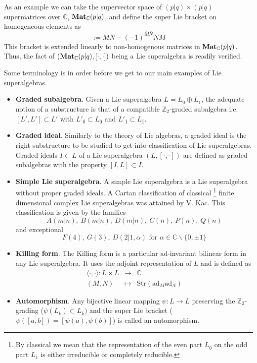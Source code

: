 \documentclass[a4paper,12pt]{article}
\numberwithin{equation}{section}
\numberwithin{thm}{section}
\numberwithin{exm}{section}
\newcommand{\ad}{\mathrm{ad}}
\newcommand{\str}{\mathrm{Str}}
\newcommand{\Z}{{\mathbb Z}}
\newcommand{\C}{{\mathbb C}}
\newcommand{\<}{{\langle}}
\renewcommand{\>}{{\rangle}}
\newcommand{\ev}{{\bar 0}}
\newcommand{\od}{{\bar 1}}
\renewcommand{\a}{{\alpha}}
\begin{document}
As an example we can take the supervector space of $(p|q)\times(p|q)$ supermatrices over $\C$, ${\bf Mat}_{\C}(p|q)$, and define the super Lie bracket on homogeneous elements as
	\begin{equation}
	[M,N] := MN - (-1)^{\bar M\bar N}NM
	\end{equation}
This bracket is extended linearly to non-homogenous matrices in ${\bf Mat}_\C(p|q)$. Thus, the fact of $({\bf Mat}_\C(p|q), [\cdot,\cdot])$ being a Lie superalgebra is readily verified.

Some terminology is in order before we get to our main examples of Lie superalgebras.
	\begin{itemize}
	\item {\bf Graded subalgebra}. Given a Lie superalgebra $L = L_\ev\oplus L_\od$, the adequate notion of a substructure is that of a compatible $\Z_2$-graded subalgebra i.e. $[L',L']\subset L'$ with $L'_\ev \subset L_\ev$ and $L'_\od\subset L_\od$.
	\item {\bf Graded ideal}. Similarly to the theory of Lie algebras, a graded ideal is the right substructure to be studied to get into classification of Lie superalgebras. Graded ideals $I\subset L$ of a Lie superalgebra $(L,[\cdot,\cdot])$ are defined as graded subalgebras with the property $[I,L] \subset I$.
	\item {\bf Simple Lie superalgebra}. A simple Lie superalgebra is a Lie superalgebra without proper graded ideals. A Cartan classification of classical%
\footnote{By classical we mean that the representation of the even part $L_\ev$ on the odd part $L_\od$ is either irreducible or completely reducible.}
finite dimensional complex Lie superalgebras was attained by V. Kac\cite{Kac1977a}. This classification is given by the families
	\begin{equation}
	A(m|n),\ B(m|n),\ D(m|n),\ C(n),\ P(n),\ Q(n)
	\end{equation}
	and exceptional
	\begin{equation}
	F(4),\ G(3),\ D(2|1,\a)\text{ for }\a\in\C\backslash\{0,\pm 1\}
	\end{equation}
	\item {\bf Killing form}. The Killing form is a particular $\ad$-invariant bilinear form in any Lie superalgebra. It uses the adjoint representation of $L$ and is defined as
		\begin{equation}
			\begin{array}{rcl}
			\<\cdot,\cdot\>: L\times L & \rightarrow & \C \\
			(M,N) & \mapsto & \str(\ad_M \ad_N)
			\end{array}
		\end{equation}
	\item {\bf Automorphism}. Any bijective linear mapping $\psi:L \rightarrow L$ preserving the $\Z_2$-grading ($\psi(L_{\bar k})\subset L_{\bar k})$ and the super Lie bracket ($\psi([a,b])=[\psi(a),\psi(b)]$) is called an automorphism.
	\end{itemize}
\end{document}
